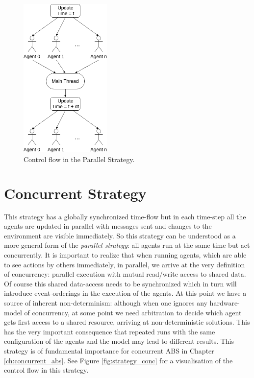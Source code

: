\begin{figure}[H]
	\centering
	\includegraphics[width=0.4\textwidth, angle=0]{./fig/implabs/parallel.png}
	\caption{Control flow in the Parallel Strategy.}
	\label{fig:strategy_par}
\end{figure}

\section{Concurrent Strategy}
This strategy has a globally synchronized time-flow but in each time-step all the agents are updated in parallel with messages sent and changes to the environment are visible immediately. So this strategy can be understood as a more general form of the \textit{parallel strategy}: all agents run at the same time but act concurrently. It is important to realize that when running agents, which are able to see actions by others immediately, in parallel, we arrive at the very definition of concurrency: parallel execution with mutual read/write access to shared data. Of course this shared data-access needs to be synchronized which in turn will introduce event-orderings in the execution of the agents. At this point we have a source of inherent non-determinism: although when one ignores any hardware-model of concurrency, at some point we need arbitration to decide which agent gets first access to a shared resource, arriving at non-deterministic solutions. This has the very important consequence that repeated runs with the same configuration of the agents and the model may lead to different results. This strategy is of fundamental importance for concurrent ABS in Chapter \ref{ch:concurrent_abs}. See Figure \ref{fig:strategy_conc} for a visualisation of the control flow in this strategy.

